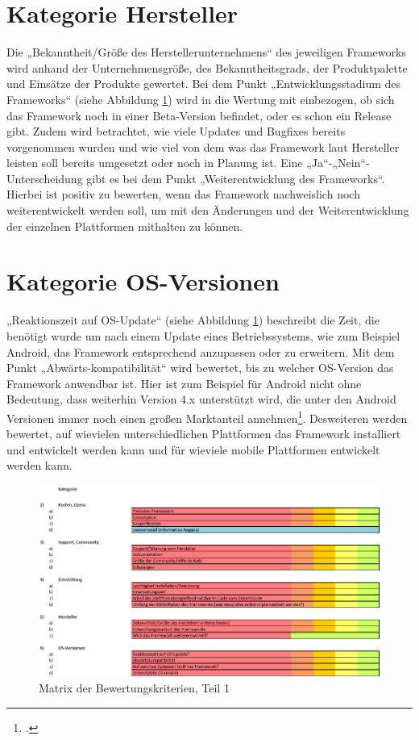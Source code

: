 \section{Kategorie Hersteller}

Die „Bekanntheit/Größe des Herstellerunternehmens“ des jeweiligen Frameworks wird anhand der Unternehmensgröße, des Bekanntheitsgrads, der Produktpalette und Einsätze der Produkte gewertet. Bei dem Punkt „Entwicklungsstadium des Frameworks“ (siehe Abbildung \ref{fig:Bewertungskriterien_1}) wird in die Wertung mit einbezogen, ob sich das Framework noch in einer Beta-Version befindet, oder es schon ein Release gibt. Zudem wird betrachtet, wie viele Updates und Bugfixes bereits vorgenommen wurden und wie viel von dem was das Framework laut Hersteller leisten soll bereits umgesetzt oder noch in Planung ist. Eine „Ja“-„Nein“-Unterscheidung gibt es bei dem Punkt „Weiterentwicklung des Frameworks“. Hierbei ist positiv zu bewerten, wenn das Framework nachweislich noch weiterentwickelt werden soll, um mit den Änderungen und der Weiterentwicklung der einzelnen Plattformen mithalten zu können.

\section{Kategorie OS-Versionen}

„Reaktionszeit auf OS-Update“ (siehe Abbildung \ref{fig:Bewertungskriterien_1}) beschreibt die Zeit, die benötigt wurde um nach einem Update eines Betriebssystems, wie zum Beispiel Android, das Framework entsprechend anzupassen oder zu erweitern. Mit dem Punkt „Abwärts-kompatibilität“ wird bewertet, bis zu welcher OS-Version das Framework anwendbar ist. Hier ist zum Beispiel für Android nicht ohne Bedeutung, dass weiterhin Version 4.x unterstützt wird, die unter den Android Versionen immer noch einen großen Marktanteil annehmen\footcite{AndroidMarktanteil4}. Desweiteren werden bewertet, auf wievielen unterschiedlichen Plattformen das Framework installiert und entwickelt werden kann und für wieviele mobile Plattformen entwickelt werden kann. 

\begin{figure}[h]
	\centering
	\includegraphics[width=1\textwidth]{Bilder/Bewertungsmatrix_1.PNG}
	\caption{Matrix der Bewertungskriterien, Teil 1}
	\label{fig:Bewertungskriterien_1}
\end{figure}

